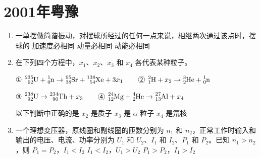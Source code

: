 \documentclass[\gkver]{gaokaozhenti}
\begin{document}
\chapter{2001年粤豫}

\begin{enumerate}
\item
一单摆做简谐振动，对摆球所经过的任何一点来说，相继两次通过该点时，摆球的
{加速度必相同}
{动量必相同}
{动能必相同}

\item
在下列四个方程中，$x_{1}$、$x_{2}$、$x_{3}$ 和 $x_{4}$ 各代表某种粒子。

① $\ce{^{235}_{92}U}+\ce{^{1}_{0}n}\to\ce{^{95}_{38}Sr}+\ce{^{138}_{54}Xe}+3x_{1}$　　② $\ce{^{2}_{1}H}+x_{2}\to\ce{^{3}_{2}He}+\ce{^{1}_{0}n}$

③ $\ce{^{238}_{92}U}\to\ce{^{234}_{90}Th}+x_{3}$　　④ $\ce{^{24}_{12}Mg}+\ce{^{4}_{2}He}\to\ce{^{27}_{13}Al}+x_{4}$

以下判断中正确的是
{$x_{2}$ 是质子}
{$x_{3}$ 是 $\alpha$ 粒子}
{$x_{4}$ 是氘核}

\item
一个理想变压器，原线圈和副线圈的匝数分别为 $n_{1}$ 和 $n_{2}$，正常工作时输入和输出的电压、电流、功率分别为 $U_{1}$ 和 $U_{2}$、$I_{1}$ 和 $I_{2}$、$P_{1}$ 和 $P_{2}$。已知 $n_{1} > n_{2}$，则
{$P_{1} = P_{2}$，$I_{1} < I_{2}$}
{$I_{1} < I_{2}$，$U_{1} > U_{2}$}
{$P_{1} > P_{2}$，$I_{1} > I_{2}$}


\end{enumerate}
\end{document}
